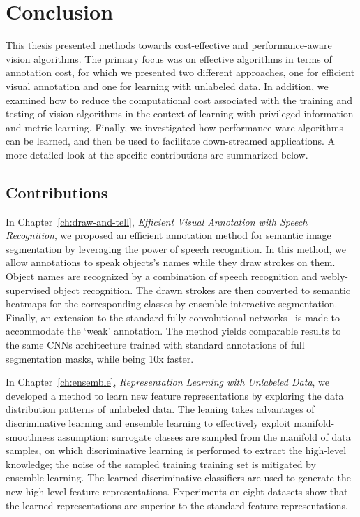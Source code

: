 \chapter{Conclusion} 
\label{ch:conclusion}

This thesis presented methods towards cost-effective and performance-aware vision algorithms.  The primary focus was on  effective algorithms in terms of annotation cost, for which we presented two different approaches, one for efficient visual annotation and one for learning with unlabeled data.  In addition, we examined how to reduce the computational cost associated with the training and testing of vision algorithms in the context of learning with privileged information and metric learning.   Finally, we investigated how  performance-ware algorithms can be learned, and then be used to facilitate down-streamed applications. A more detailed look at the specific contributions are summarized below. 

\section{Contributions} 

In Chapter~\ref{ch:draw-and-tell}, \emph{Efficient Visual Annotation with Speech Recognition}, we proposed an efficient annotation method for semantic image segmentation by leveraging the power of speech recognition. In this method, we allow annotations to speak  objects's names while they draw strokes on them.  Object names are recognized by a combination of speech recognition and webly-supervised object recognition.  The drawn strokes are then converted to semantic heatmaps for the corresponding classes by ensemble interactive segmentation. Finally, an extension to the standard fully convolutional networks~\citep{Long_2015_CVPR} is made to accommodate the `weak' annotation. The method yields comparable results to the same CNNs architecture trained with standard  annotations of full segmentation masks, while being 10x faster. 
 
In Chapter~\ref{ch:ensemble}, \emph{Representation Learning with Unlabeled Data}, we developed a method to learn new feature representations by exploring the data distribution patterns of unlabeled data.  The leaning takes advantages of discriminative learning and ensemble learning to effectively exploit  manifold-smoothness assumption: surrogate classes are sampled from the manifold of data samples, on which discriminative learning is performed to extract the high-level knowledge; the noise of the sampled training training set is mitigated by ensemble learning. The learned discriminative classifiers are used to generate the new high-level feature representations. Experiments on eight datasets show that the learned representations are superior to the standard feature representations. 

